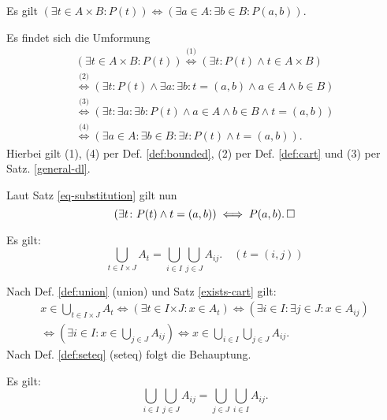 \begin{Satz}\label{exists-cart}
Es gilt $(\exists t\in A{\times}B\colon P(t))
\Leftrightarrow (\exists a{\in}A\colon \exists b{\in}B\colon P(a,b))$.
\end{Satz}

\begin{Beweis}
Es findet sich die Umformung
\begin{gather*}
(\exists t{\in}A{\times}B\colon P(t))
\stackrel{\text{(1)}}{\iff} (\exists t\colon P(t)\land t\in A\times B)\\
\stackrel{\text{(2)}}{\iff}
(\exists t\colon P(t)\land \exists a\colon\exists b\colon t=(a,b)\land a\in A\land b\in B)\\
\stackrel{\text{(3)}}{\iff}
(\exists t\colon \exists a\colon \exists b\colon P(t)\land a\in A\land b\in B\land t=(a,b))\\
\stackrel{\text{(4)}}{\iff}
(\exists a{\in}A\colon \exists b{\in}B\colon \exists t\colon P(t)\land t=(a,b)).
\end{gather*}
Hierbei gilt (1), (4) per Def. \ref{def:bounded}, (2) per Def. \ref{def:cart}
und (3) per Satz. \ref{general-dl}.

Laut Satz \ref{eq-substitution} gilt nun
\[(\exists t\colon P(t)\land t=(a,b))\iff P(a,b).\,\square\]
\end{Beweis}

\begin{Satz}\label{cup-cart}
Es gilt:
\[\bigcup_{t\in I\times J} A_t
= \bigcup_{i\in I}\bigcup_{j\in J} A_{ij}.\quad (t=(i,j))\]
\end{Satz}

\begin{Beweis}
Nach Def. \ref{def:union} (union) und Satz \ref{exists-cart} gilt:
\begin{gather*}
x\in \bigcup_{t\in I\times J} A_t
\iff (\exists t\in I{\times J}\colon x\in A_t)
\iff (\exists i{\in}I\colon\exists j{\in}J\colon x\in A_{ij})\\
\iff (\exists i{\in}I\colon x\in \bigcup_{j\in J} A_{ij})
\iff x\in\bigcup_{i\in I}\bigcup_{j\in J} A_{ij}.
\end{gather*}
Nach Def. \ref{def:seteq} (seteq) folgt die Behauptung.\,\qedsymbol
\end{Beweis}

\begin{Satz}
Es gilt:
\[\bigcup_{i\in I}\bigcup_{j\in J} A_{ij}
= \bigcup_{j\in J}\bigcup_{i\in I} A_{ij}.\]
\end{Satz}

